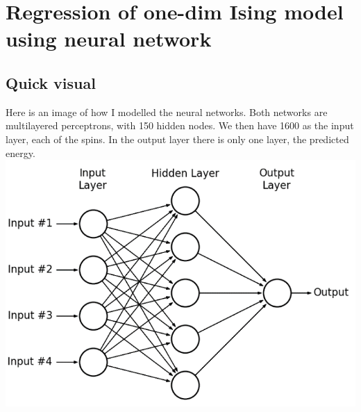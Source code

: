 \documentclass[a4paper,norsk]{article}
\begin{document}
\clearpage
\section{Regression of one-dim Ising model using neural network}
\subsection{Quick visual}
Here is an image of how I modelled the neural networks. Both networks are multilayered perceptrons, with 150 hidden nodes. We then have 1600 as the input layer, each of the spins. In the output layer there is only one layer, the predicted energy.\\
\includegraphics[scale=.4]{images/mlplayout}\\
\end{document}
